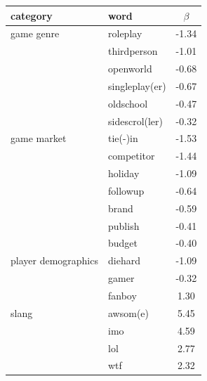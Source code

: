 \documentclass{sig-alternate}
\begin{document}
\begin{table}[tb!]
\centering
\small
\sffamily
\begin{tabular}{llc}
\textbf{category} & \textbf{word} & $\beta$ \\ 
\midrule 
game genre 
& roleplay & -1.34 \\
& thirdperson & -1.01 \\
& openworld & -0.68 \\
& singleplay(er) & -0.67 \\
& oldschool & -0.47 \\
& sidescrol(ler) & -0.32 \\ [2ex]

\midrule 
game market 
& tie(-)in & -1.53 \\
& competitor & -1.44 \\ 
& holiday & -1.09 \\ 
& followup & -0.64 \\ 
& brand & -0.59 \\ 
& publish & -0.41 \\ 
& budget & -0.40 \\ [2ex]


\midrule 
player demographics 
& diehard & -1.09 \\ 
& gamer & -0.32 \\ 
& fanboy & 1.30 \\ [2ex]

\midrule 
slang 
& awsom(e) & 5.45 \\ 
& imo & 4.59 \\ 
& lol & 2.77 \\ 
& wtf & 2.32 \\ [2ex]


\end{tabular}
\end{table}
\end{document}
